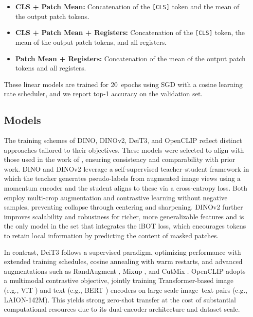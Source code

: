 \documentclass[10pt]{article} \usepackage[preprint]{tmlr}
\begin{document}
\begin{itemize}
    \item \textbf{CLS + Patch Mean:} Concatenation of the \texttt{[CLS]} token and the mean of the output patch tokens.  
    \item \textbf{CLS + Patch Mean + Registers:} Concatenation of the \texttt{[CLS]} token, the mean of the output patch tokens, and all registers.  
    \item \textbf{Patch Mean + Registers:} Concatenation of the mean of the output patch tokens and all registers.  
\end{itemize}

These linear models are trained for 20~epochs using SGD with a cosine learning rate scheduler, and we report top-1 accuracy on the validation set.

\subsection{Models}

The training schemes of DINO, DINOv2, DeiT3, and OpenCLIP reflect distinct approaches tailored to their objectives. These models were selected to align with those used in the work of \citet{darcet2024registers}, ensuring consistency and comparability with prior work. DINO \citep{Caron2021dino} and DINOv2 \citep{oquab2023dinov2} leverage a self-supervised teacher–student framework in which the teacher generates pseudo-labels from augmented image views using a momentum encoder and the student aligns to these via a cross-entropy loss. Both employ multi-crop augmentation and contrastive learning without negative samples, preventing collapse through centering and sharpening. DINOv2 further improves scalability and robustness for richer, more generalizable features and is the only model in the set that integrates the iBOT loss, which encourages tokens to retain local information by predicting the content of masked patches.

In contrast, DeiT3 \citep{touvron2022deit} follows a supervised paradigm, optimizing performance with extended training schedules, cosine annealing with warm restarts, and advanced augmentations such as RandAugment \citep{randaugment}, Mixup \citep{mixup}, and CutMix \citep{cutmix}. OpenCLIP \citep{datacomp2023} adopts a multimodal contrastive objective, jointly training Transformer-based image (e.g., ViT \citep{dosovitskiy2021vit}) and text (e.g., BERT \citep{devlin2019bert}) encoders on large-scale image–text pairs (e.g., LAION-142M). This yields strong zero-shot transfer at the cost of substantial computational resources due to its dual-encoder architecture and dataset scale.
\end{document}
